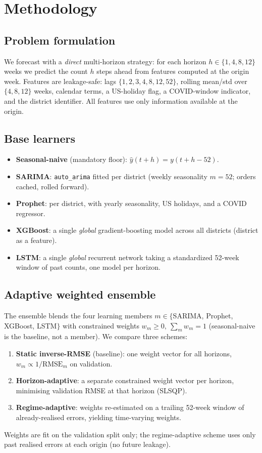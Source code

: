 \documentclass[11pt]{article}
\begin{document}
\section{Methodology}
\subsection{Problem formulation}
We forecast with a \emph{direct} multi-horizon strategy: for each horizon $h\in\{1,4,8,12\}$ weeks we
predict the count $h$ steps ahead from features computed at the origin week. Features are
leakage-safe: lags $\{1,2,3,4,8,12,52\}$, rolling mean/std over $\{4,8,12\}$ weeks, calendar terms,
a US-holiday flag, a COVID-window indicator, and the district identifier. All features use only
information available at the origin.

\subsection{Base learners}
\begin{itemize}
  \item \textbf{Seasonal-naive} (mandatory floor): $\hat{y}(t{+}h)=y(t{+}h{-}52)$.
  \item \textbf{SARIMA}: \texttt{auto\_arima} fitted per district (weekly seasonality $m{=}52$;
  orders cached, rolled forward).
  \item \textbf{Prophet}: per district, with yearly seasonality, US holidays, and a COVID regressor.
  \item \textbf{XGBoost}: a single \emph{global} gradient-boosting model across all districts (district
  as a feature).
  \item \textbf{LSTM}: a single \emph{global} recurrent network taking a standardized 52-week window of
  past counts, one model per horizon.
\end{itemize}

\subsection{Adaptive weighted ensemble}
The ensemble blends the four learning members $m\in\{$SARIMA, Prophet, XGBoost, LSTM$\}$ with
constrained weights $w_m\ge 0,\ \sum_m w_m=1$ (seasonal-naive is the baseline, not a member). We
compare three schemes:
\begin{enumerate}
  \item \textbf{Static inverse-RMSE} (baseline): one weight vector for all horizons, $w_m\propto
  1/\mathrm{RMSE}_m$ on validation.
  \item \textbf{Horizon-adaptive}: a separate constrained weight vector per horizon, minimising
  validation RMSE at that horizon (SLSQP).
  \item \textbf{Regime-adaptive}: weights re-estimated on a trailing 52-week window of already-realised
  errors, yielding time-varying weights.
\end{enumerate}
Weights are fit on the validation split only; the regime-adaptive scheme uses only past realised
errors at each origin (no future leakage).
\end{document}
